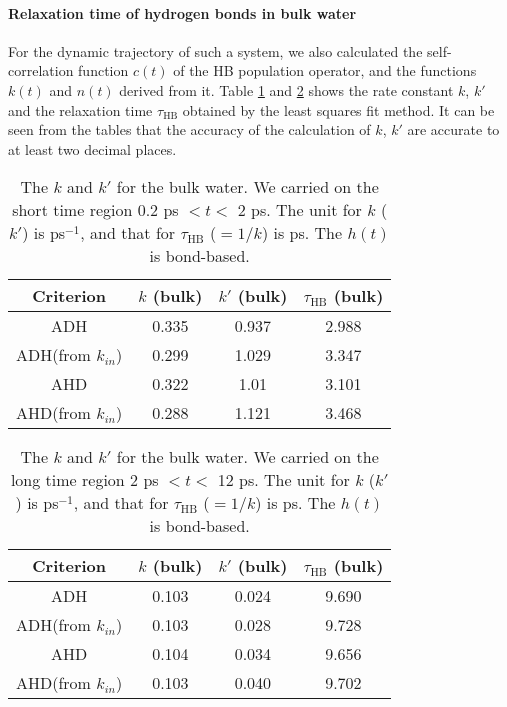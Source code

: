{\paragraph{Relaxation time of hydrogen bonds in bulk water}\label{rate_const_and_tau_R_128w}
% 
For the dynamic trajectory of such a system, we also calculated the self-correlation function $c(t)$ of the HB population operator, 
and the functions $k(t)$ and $n(t)$ derived from it. 
Table \ref{tab:k_k_prime_128w_1} and \ref{tab:k_k_prime_128w_2} shows the rate constant $k$, $k'$ and 
the relaxation time $\tau_\text{HB}$ obtained by the least squares fit method. 
It can be seen from the tables that the accuracy of the calculation of $k$, $k'$ are accurate to at least two decimal places.

%
\begin{table}[htbp]
\centering
\caption{\label{tab:k_k_prime_128w_1} 
    The $k$ and $k'$ for the bulk water. We carried on the short time region 0.2 ps $< t <$ 2 ps. 
The unit for $k$ ($k'$) is ps$^{-1}$, and that for $\tau_{\text{HB}}$ ($=1/k$) is ps. The $h(t)$ is bond-based.} 
\begin{tabular}{cccc}
 Criterion & $k$  (bulk) & $k'$ (bulk) & $\tau_{\text{HB}}$ (bulk) \\
\hline
  ADH & 0.335 & 0.937 & 2.988  \\
  ADH(from $k_{in}$) & 0.299  & 1.029 & 3.347   \\
  AHD & 0.322 & 1.01 & 3.101 \\ 
  AHD(from $k_{in}$) & 0.288 & 1.121 & 3.468 \\ 
\end{tabular}
\end{table}
%
\begin{table}[htbp]
\centering
\caption{\label{tab:k_k_prime_128w_2} 
    The $k$ and $k'$ for the bulk water. We carried on the long time region 2 ps $< t <$ 12 ps. 
The unit for $k$ ($k'$) is ps$^{-1}$, and that for $\tau_{\text{HB}}$ ($=1/k$) is ps. The $h(t)$ is bond-based.} 
\begin{tabular}{cccc}
 Criterion & $k$  (bulk) & $k'$ (bulk) & $\tau_{\text{HB}}$ (bulk) \\
\hline
  ADH & 0.103 & 0.024 & 9.690 \\
  ADH(from $k_{in}$) & 0.103  & 0.028 & 9.728 \\
  AHD & 0.104 & 0.034 & 9.656  \\
  AHD(from $k_{in}$) & 0.103  & 0.040 & 9.702  \\
\end{tabular}
\end{table}

}
